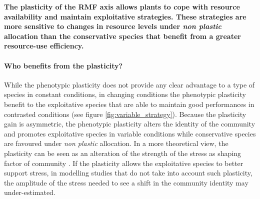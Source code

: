 \textbf{The plasticity of the RMF axis allows plants to cope with resource availability and maintain exploitative strategies. These strategies are more sensitive to changes in resource levels under \textit{non plastic} allocation than the conservative species that benefit from a greater resource-use efficiency.}




%

\paragraph{Who benefits from the plasticity?}
While the phenotypic plasticity does not provide any clear advantage to a type of species in constant conditions, in changing conditions the phenotypic plasticity benefit to the exploitative species that are able to maintain good performances in contrasted conditions (see figure \ref{fig:variable_strategy}). Because the plasticity gain is asymmetric, the phenotypic plasticity alters the identity of the community and promotes exploitative species in variable conditions while conservative species are favoured under \textit{non plastic} allocation. In a more theoretical view, the plasticity can be seen as an alteration of the strength of the stress as shaping factor of community \parencite{grime_evidence_1977}. If the plasticity allows the exploitative species to better support stress, in modelling studies that do not take into account such plasticity, the amplitude of the stress needed to see a shift in the community identity may under-estimated.

